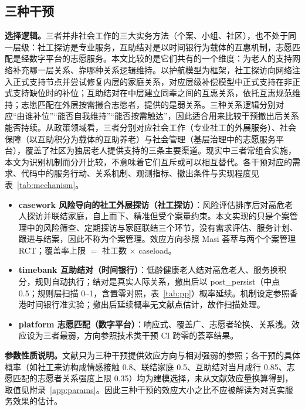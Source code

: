\documentclass[10.5pt,twocolumn]{ctexart}
\begin{document}
\subsection{三种干预}\label{sec:interventions}
\textbf{选择逻辑。}三者并非社会工作的三大实务方法（个案、小组、社区），也不处于同一层级：社工探访是专业服务，互助结对是以时间银行为载体的互惠机制，志愿匹配是经数字平台的志愿服务。本文比较的是它们共有的一个维度：为老人的支持网络补充哪一层关系、靠哪种关系逻辑维持。以护航模型\citep{kahn1980convoys}为框架，社工探访向网络注入正式支持节点并尝试修复内层的家庭关系，对应层级补偿模型中正式支持在非正式支持缺位时的补位\citep{cantor1979neighbors}；互助结对在中层建立同辈之间的互惠关系，依托互惠规范维持\citep{gouldner1960norm}；志愿匹配在外层按需撮合志愿者，提供的是弱关系\citep{granovetter1973weak}。三种关系逻辑分别对应``由谁补位''``能否自我维持''``能否按需触达''，因此适合用来比较干预撤出后关系能否持续。从政策领域看，三者分别对应社会工作（专业社工的外展服务）、社会保障（以互助积分为载体的互助养老）与社会管理（基层治理中的志愿服务平台），覆盖了社区为独居老人提供支持的三条主要渠道。现实中三者常组合实施，本文为识别机制而分开比较，不意味着它们互斥或可以相互替代。各干预对应的需求、代码中的服务行动、关系机制、观测指标、撤出条件与实现程度见表~\ref{tab:mechanism}。
\begin{itemize}
  \item \textbf{casework 风险导向的社工外展探访（社工探访）}：风险评估排序后对高危老人探访并联结家庭，自上而下、精准但受个案量约束。本文实现的只是个案管理中的风险筛查、定期探访与家庭联结三个环节，没有需求评估、服务计划、跟进与结案，因此不称为个案管理。效应方向参照 Masi 荟萃\citep{masi2011meta}与两个个案管理 RCT\citep{ristolainen2020effects,taube2018case}；覆盖率上限 $=$ 社工数 $\times$ caseload。
  \item \textbf{timebank 互助结对（时间银行）}：低龄健康老人结对高危老人、服务换积分，规则自动执行；结对是真实人际关系，撤出后以 post\_persist（中点 0.5；规则层扫描 0--1，含置零对照，表~\ref{tab:pp}）概率延续。机制设定参照香港时间银行准实验\citep{lu2024timebank}；撤出后延续概率无文献点估计，故作扫描处理。
  \item \textbf{platform 志愿匹配（数字平台）}：响应式、覆盖广、志愿者轮换、关系浅。效应设为三者最弱，方向参照技术类干预 CI 跨零的荟萃结果\citep{hoang2022interventions}。
\end{itemize}
\textbf{参数性质说明。}文献只为三种干预提供效应方向与相对强弱的参照；各干预的具体概率（如社工来访构成情感接触 0.8、联结家庭 0.5、互助结对当月成行 0.85、志愿匹配的志愿者关系强度上限 0.35）均为建模选择，未从文献效应量换算得到，取值见附录~\ref{app:params}。因此三种干预的效应大小之比不应被解读为对真实服务效果的估计。
\end{document}
